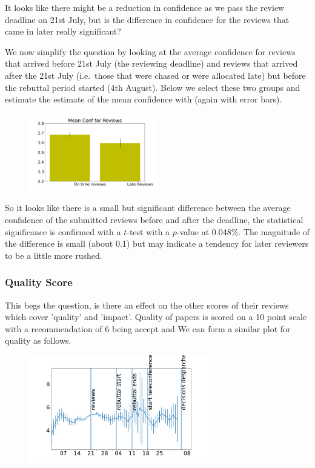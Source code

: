 It looks like there might be a reduction in confidence as we pass the
review deadline on 21st July, but is the difference in confidence for
the reviews that came in later really significant?

We now simplify the question by looking at the average confidence for
reviews that arrived before 21st July (the reviewing deadline) and
reviews that arrived after the 21st July (i.e.~those that were chased or
were allocated late) but before the rebuttal period started (4th
August). Below we select these two groups and estimate the estimate of
the mean confidence with (again with error bars).

\begin{figure}[htb]
\includegraphics[width=0.50\textwidth]{diagrams/neurips/review-confidence-early-late.pdf}


\caption{}
\label{review-confidence-early-late}
\end{figure}

So it looks like there is a small but significant difference between the
average confidence of the submitted reviews before and after the
deadline, the statistical significance is confirmed with a \(t\)-test
with a \(p\)-value at 0.048\%. The magnitude of the difference is small
(about 0.1) but may indicate a tendency for later reviewers to be a
little more rushed.

\hypertarget{quality-score}{%
\subsubsection{Quality Score}\label{quality-score}}

This begs the question, is there an effect on the other scores of their
reviews which cover 'quality' and 'impact'. Quality of papers is scored
on a 10 point scale with a recommendation of 6 being accept and We can
form a similar plot for quality as follows.

\begin{figure}[htb]
\includegraphics[width=0.70\textwidth]{diagrams/neurips/review-quality-time.pdf}


\caption{}
\label{review-quality-time}
\end{figure}

